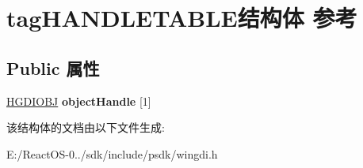 \hypertarget{structtag_h_a_n_d_l_e_t_a_b_l_e}{}\section{tag\+H\+A\+N\+D\+L\+E\+T\+A\+B\+L\+E结构体 参考}
\label{structtag_h_a_n_d_l_e_t_a_b_l_e}
\subsection*{Public 属性}
\begin{DoxyCompactItemize}
\item 
\mbox{\label{structtag_h_a_n_d_l_e_t_a_b_l_e_a73a1485a3f869efe98f675ec69b9332f}} 
\hyperlink{interfacevoid}{H\+G\+D\+I\+O\+BJ} {\bfseries object\+Handle} \mbox{[}1\mbox{]}
\end{DoxyCompactItemize}


该结构体的文档由以下文件生成\+:\begin{DoxyCompactItemize}
\item 
E\+:/\+React\+O\+S-\/0../sdk/include/psdk/wingdi.\+h\end{DoxyCompactItemize}
